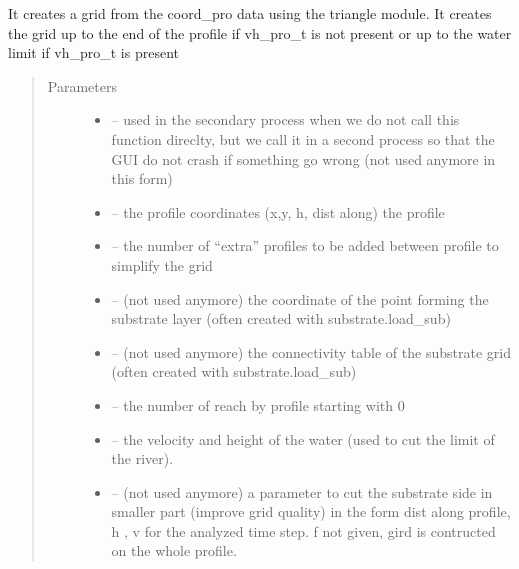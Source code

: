 \documentclass[letterpaper,10pt,english]{sphinxmanual}
\begin{document}
\begin{fulllineitems}
\label{\detokenize{index:src.manage_grid_8.create_grid}}
It creates a grid from the coord\_pro data using the triangle module.
It creates the grid up to the end of the profile if vh\_pro\_t is not present
or up to the water limit if vh\_pro\_t is present
\begin{quote}\begin{description}
\item[{Parameters}] \leavevmode\begin{itemize}
\item {} 
 -- used in the secondary process  when we do not call this function direclty, but we call it in a second
process so that the GUI do not crash if something go wrong (not used anymore in this form)

\item {} 
 -- the profile coordinates (x,y, h, dist along) the profile

\item {} 
 -- the number of ``extra'' profiles to be added between profile to simplify the grid

\item {} 
 -- (not used anymore)
the coordinate of the point forming the substrate layer (often created with substrate.load\_sub)

\item {} 
 -- (not used anymore)
the connectivity table of the substrate grid (often created with substrate.load\_sub)

\item {} 
 -- the number of reach by profile starting with 0

\item {} 
 -- the velocity and height of the water (used to cut the limit of the river).

\item {} 
 -- (not used anymore) a parameter to cut the substrate side in smaller part (improve grid quality)
in the form dist along profile, h , v for the analyzed time step. f not given, gird is contructed on the whole profile.


\end{itemize}
\end{description}
\end{quote}
\end{fulllineitems}
\end{document}
